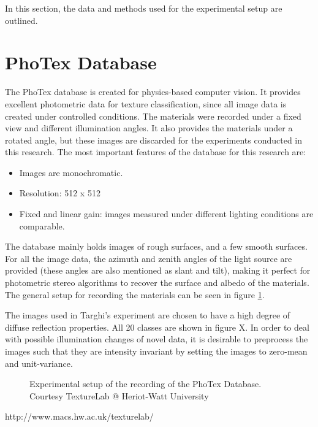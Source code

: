 \hypertarget{Approach}{
}
In this section, the data and methods used for the experimental setup are outlined.

\section{PhoTex Database}\label{Photex}
The PhoTex database is created for physics-based computer vision. It provides excellent photometric data for texture classification, since all image data is  created under controlled conditions. The materials were recorded under a fixed view and different illumination angles. It also provides the materials under a rotated angle, but these images are discarded for the experiments conducted in this research. The most important features of the database for this research are:
\begin{itemize}
	\item Images are monochromatic.
	\item Resolution: 512 x 512
	\item Fixed and linear gain: images measured under different lighting conditions are comparable. 
\end{itemize}

\noindent The database mainly holds images of rough surfaces, and a few smooth surfaces. For all the image data, the azimuth and zenith angles of the light source are provided (these angles are also mentioned as slant and tilt), making it perfect for photometric stereo algorithms to recover the surface and albedo of the materials. The general setup for recording the materials can be seen in figure \ref{fig:PHOTEX_SETUP}. 

The images used in Targhi's experiment are chosen to have a high degree of diffuse reflection properties. All 20 classes are shown in figure X. In order to deal with possible illumination changes of novel data, it is desirable to preprocess the images such that they are intensity invariant by setting the images to zero-mean and unit-variance. 


\begin{figure}[H]
	\begin{center}
	\end{center}
	\caption{Experimental setup of the recording of the PhoTex Database. Courtesy TextureLab @ Heriot-Watt University}
	\label{fig:PHOTEX_SETUP}
\end{figure}


http://www.macs.hw.ac.uk/texturelab/

